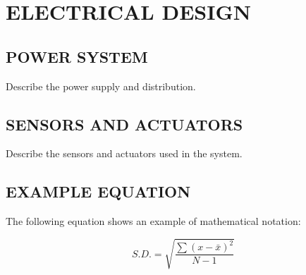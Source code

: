 \chapter{ELECTRICAL DESIGN}

\section{POWER SYSTEM}

Describe the power supply and distribution.

\section{SENSORS AND ACTUATORS}

Describe the sensors and actuators used in the system.

\section{EXAMPLE EQUATION}

The following equation shows an example of mathematical notation:

\begin{equation}
S.D. = \sqrt{\frac{\sum(x - \bar{x})^2}{N - 1}}
\label{eq:sd}
\end{equation}
